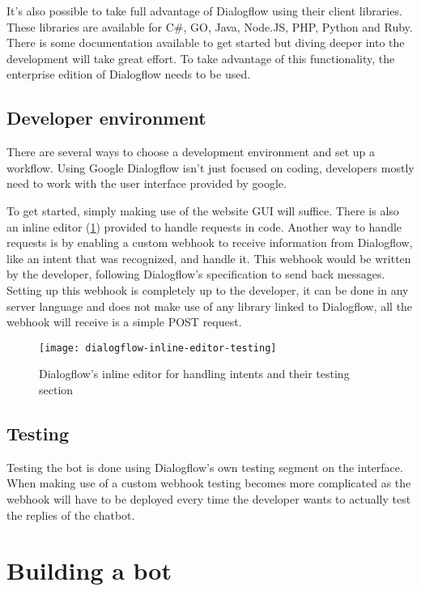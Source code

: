 It's also possible to take full advantage of Dialogflow using their client libraries. These libraries are available for C\#, GO, Java, Node.JS, PHP, Python and Ruby. There is some documentation available to get started but diving deeper into the development will take great effort. To take advantage of this functionality, the enterprise edition of Dialogflow needs to be used.

\subsection{Developer environment}

There are several ways to choose a development environment and set up a workflow. Using Google Dialogflow isn't just focused on coding, developers mostly need to work with the user interface provided by google.

To get started, simply making use of the website GUI will suffice. There is also an inline editor (\ref{fig:dialogflow-inline-editor-testing}) provided to handle requests in code. Another way to handle requests is by enabling a custom webhook to receive information from Dialogflow, like an intent that was recognized, and handle it. This webhook would be written by the developer, following Dialogflow's specification to send back messages. Setting up this webhook is completely up to the developer, it can be done in any server language and does not make use of any library linked to Dialogflow, all the webhook will receive is a simple POST request.

\begin{figure}[ht]
	\centering
	\texttt{[image: dialogflow-inline-editor-testing]}
	\caption{Dialogflow's inline editor for handling intents and their testing section}
	\label{fig:dialogflow-inline-editor-testing}
\end{figure}


\subsection{Testing}

Testing the bot is done using Dialogflow's own testing segment on the interface. When making use of a custom webhook testing becomes more complicated as the webhook will have to be deployed every time the developer wants to actually test the replies of the chatbot.

\clearpage
\newpage

\section{Building a bot}

